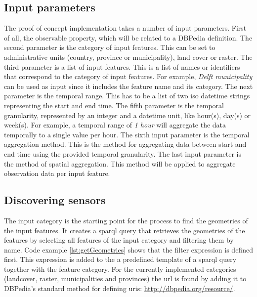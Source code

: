 \subsection{Input parameters}
The proof of concept implementation takes a number of input parameters. First of all, the observable property, which will be related to a DBPedia definition. The second parameter is the category of input features. This can be set to administrative units (country, province or municipality), land cover or raster. The third parameter is a list of input features. This is a list of names or identifiers that correspond to the category of input features. For example, \textit{Delft municipality} can be used as input since it includes the feature name and its category. The next parameter is the temporal range. This has to be a list of two \ac{iso} datetime strings representing the start and end time. The fifth parameter is the temporal granularity, represented by an integer and a datetime unit, like hour(s), day(s) or week(s). For example, a temporal range of \textit{1 hour} will aggregate the data temporally to a single value per hour. The sixth input parameter is the temporal aggregation method. This is the method for aggregating data between start and end time using the provided temporal granularity. The last input parameter is the method of spatial aggregation. This method will be applied to aggregate observation data per input feature.       

\subsection{Discovering sensors}
\label{par:discoverSensors}
The input category is the starting point for the process to find the geometries of the input features. It creates a \ac{sparql} query that retrieves the geometries of the features by selecting all features of the input category and filtering them by name. Code example \ref{lst:getGeometries} shows that the filter expression is defined first. This expression is added to the a predefined template of a \ac{sparql} query together with the feature category. For the currently implemented categories (landcover, raster, municipalities and provinces) the \ac{url} is found by adding it to DBPedia's standard method for defining \acp{uri}: \url{http://dbpedia.org/resource/}.    

